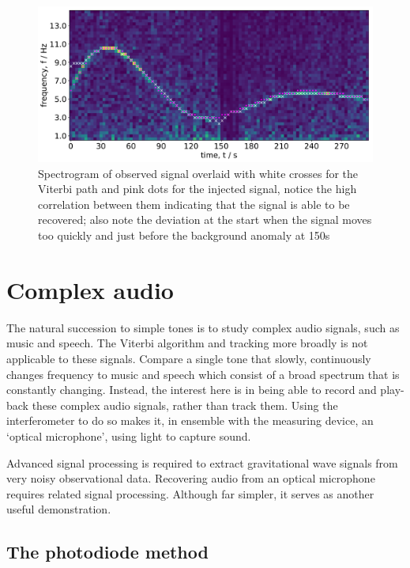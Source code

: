 \documentclass[prb,preprint]{revtex4-1}
\begin{document}
\begin{figure}
	\includegraphics[width=\textwidth]{figures/expt_overlay_2_viterbi_test_webcam.pdf}
	\caption{Spectrogram of observed signal overlaid with white crosses for the Viterbi path and pink dots for the injected signal, notice the high correlation between them indicating that the signal is able to be recovered; also note the deviation at the start when the signal moves too quickly and just before the background anomaly at 150s}
	\label{fig:viterbi_overlay}
\end{figure}

\section{Complex audio}
\label{sec:optical_microphone}

The natural succession to simple tones is to study complex audio signals, such as music and speech.
The Viterbi algorithm and tracking more broadly is not applicable to these signals. Compare a single tone that slowly, continuously changes frequency to music and speech which consist of a broad spectrum that is constantly changing.
Instead, the interest here is in being able to record and play-back these complex audio signals, rather than track them. Using the interferometer to do so makes it, in ensemble with the measuring device, an ‘optical microphone’, using light to capture sound.


Advanced signal processing is required to extract gravitational wave signals from very noisy observational data. Recovering audio from an optical microphone requires related signal processing. Although far simpler, it serves as another useful demonstration.

\subsection{The photodiode method}
\label{sec:photodiode}
\end{document}
